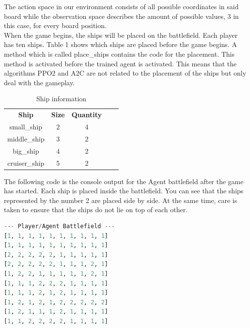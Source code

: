 \documentclass[sigconf]{acmart}
\begin{document}
The action space in our environment consists of all possible coordinates in said board while the observation space describes the amount of possible values, 3 in this case, for every board position.\\

\newline
When the game begins, the ships will be placed on the battlefield.
Each player has ten ships. Table 1 shows which ships are placed before the game begins. A method which is called place\_ships contains the code for the placement. This method is activated before the trained agent is activated. This means that the algorithms PPO2 and A2C are not related to the placement of the ships but only deal with the gameplay.

\begin{table}[htb]
\vspace{2.5mm}
\begin{tabular}{|c|c|c|ll}
\cline{1-3}
\textbf{Ship} & \textbf{Size} & \textbf{Quantity} \\ \cline{1-3}
small\_ship   & 2    & 4        \\ \cline{1-3}
middle\_ship  & 3    & 2        \\ \cline{1-3}
big\_ship     & 4    & 2        \\ \cline{1-3}
cruiser\_ship & 5    & 2        \\ \cline{1-3}
\end{tabular}
\vspace{2.5mm}
\caption{\label{tab:table-name}Ship information}
\end{table}

The following code is the console output for the Agent battlefield after the game has started. 
Each ship is placed inside the battlefield. You can see that the ships represented by the number 2 are placed side by side. At the same time, care is taken to ensure that the ships do not lie on top of each other.\\

\begin{lstlisting}[language=Python, caption=Battlefield in start condition]
--- Player/Agent Battlefield ---
[1, 1, 1, 1, 1, 1, 1, 1, 1, 1]
[1, 1, 1, 1, 1, 1, 1, 1, 1, 1]
[2, 2, 2, 2, 2, 1, 1, 1, 1, 1]
[2, 2, 2, 2, 2, 1, 1, 1, 2, 1]
[1, 2, 2, 1, 1, 1, 1, 1, 2, 1]
[1, 1, 1, 2, 2, 2, 1, 1, 1, 1]
[1, 1, 1, 2, 1, 2, 1, 1, 1, 1]
[1, 2, 1, 2, 1, 2, 2, 2, 2, 2]
[1, 2, 1, 1, 1, 2, 1, 1, 1, 1]
[1, 1, 2, 2, 2, 2, 1, 1, 1, 1]
\end{lstlisting}
\end{document}
